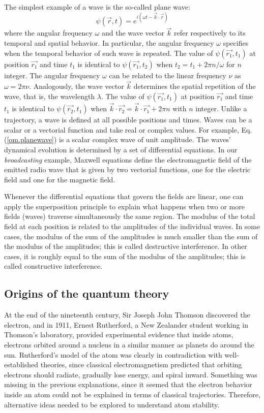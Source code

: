 \documentclass[nofootinbib, secnumarabic, amsmath, nobibnotes,11pt,aps,pra, floatfix]{revtex4-1}
\newcommand{\eref}[1]{Eq. (\ref{#1})}
\begin{document}
The simplest example of a wave is the so-called plane wave:
\begin{equation} \label{om.planewave}
\psi(\vec{r},t) = e^{i(\omega t- \vec{k} \cdot \vec{r})}
\end{equation}
where the angular frequency $\omega$ and the wave vector $\vec{k}$
refer respectively to its temporal and spatial behavior. In
particular, the angular frequency $\omega$ specifies when the
temporal behavior of such wave is repeated. The value of
$\psi(\vec{r_1},t_1) $ at position $\vec{r_1}$ and time $t_1$ is
identical to $\psi(\vec{r_1},t_2) $ when $t_2 = t_1 + 2 \pi
n/\omega$ for $n$ integer. The angular frequency $\omega$ can be
related to the linear frequency $\nu$ as $ \omega = 2 \pi \nu$.
Analogously, the wave vector $\vec{k}$ determines the spatial
repetition of the wave, that is, the wavelength $\lambda$. The value
of $\psi(\vec{r_1},t_1)$ at position $\vec{r_1}$ and time $t_1$ is
identical to $\psi(\vec{r_2},t_1)$ when $\vec{k}\cdot\vec{r_2} =
\vec{k}\cdot\vec{r_1} + 2 \pi n$ with $n$ integer. Unlike a
trajectory, a wave is defined at all possible positions and times.
Waves can be a scalar or a vectorial function and take real or
complex values. For example, \eref{om.planewave} is a scalar complex
wave of unit amplitude. The waves' dynamical evolution is determined by a set of
differential equations. In our \textit{broadcasting} example,
Maxwell equations define the electromagnetic field of the emitted
radio wave that is given by two vectorial functions, one for the
electric field and one for the magnetic field.

Whenever the differential equations that govern the fields are
linear, one can apply the superposition principle to explain what
happens when two or more fields (waves) traverse simultaneously the
same region. The modulus of the total field at each position is
related to the amplitudes of the individual waves. In some cases,
the modulus of the sum of the amplitudes is much smaller than the
sum of the modulus of the amplitudes; this is called destructive
interference. In other cases, it is roughly equal to the sum of the
modulus of the amplitudes; this is called constructive  interference.

\subsection{Origins of the quantum theory}\label{om.sec_intro.2}

At the end of the nineteenth century, Sir Joseph John Thomson discovered the electron, and in 1911, Ernest Rutherford, a New Zealander student working in Thomson's laboratory, provided experimental evidence that inside atoms, electrons orbited around a nucleus in a similar manner as planets do around the sun.
Rutherford's model of the atom was clearly in contradiction with well-established theories, since classical electromagnetism predicted that orbiting electrons should radiate, gradually lose energy, and spiral inward.
Something was missing in the previous explanations, since it seemed that the electron behavior inside an atom could not be explained in terms of classical trajectories. Therefore, alternative ideas needed to be explored to understand atom stability.
\end{document}
